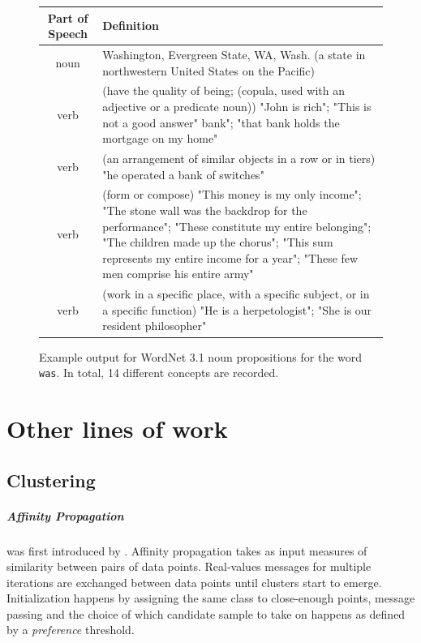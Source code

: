 \documentclass[a4paper,12pt,oneside,openright]{report}
\begin{document}
\begin{figure}[H]
\begin{center}
\begin{tabular}{ | c | p{11cm} | } 
 \hline
 Part of Speech & Definition \\ 
 \hline
noun     & Washington, Evergreen State, WA, Wash. (a state in northwestern United States on the Pacific) \\ 
verb     & (have the quality of being; (copula, used with an adjective or a predicate noun)) "John is rich"; "This is not a good answer"
 bank"; "that bank holds the mortgage on my home" \\ 
 verb     & (an arrangement of similar objects in a row or in tiers) "he operated a bank of switches"  \\ 
verb & (form or compose) "This money is my only income"; "The stone wall was the backdrop for the performance"; "These constitute my entire belonging"; "The children made up the chorus"; "This sum represents my entire income for a year"; "These few men comprise his entire army" \\ 
verb    & (work in a specific place, with a specific subject, or in a specific function) "He is a herpetologist"; "She is our resident philosopher"  \\ 
 \hline
\end{tabular}
\end{center}
\caption{Example output for WordNet 3.1 noun propositions for the word \texttt{was}. In total, 14 different concepts are recorded.}
\label{fig:was_synset}
\end{figure}

\chapter{Other lines of work}

\section{Clustering}\label{appendix:Clustering}

\paragraph{Affinity Propagation} was first introduced by \cite{frey07}.
Affinity propagation takes as input measures of similarity between pairs of data points. 
Real-values messages for multiple iterations are exchanged between data points until clusters start to emerge.
Initialization happens by assigning the same class to close-enough points, message passing and the choice of which candidate sample to take on happens as defined by a \textit{preference} threshold.
\end{document}
